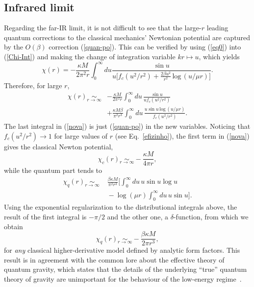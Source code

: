 \documentclass[aps,prd,a4paper,twocolumn,showpacs,showkeys,preprintnumbers,amsmath,amssymb,nofootinbib]{revtex4-2}
\numberwithin{equation}{section}
\def\beq{\begin{equation}}
\def\eeq{\end{equation}}
\def\ln{\,\mbox{log}\,}
\newcommand{\eq}[1]{(\ref{#1})}
\newcommand{\n}[1]{\label{#1}}
\def\be{\beta}
\def\ka{\kappa}
\begin{document}

\subsection{Infrared limit}
\label{pert_D}

Regarding the far-IR limit, it is not difficult to see that the large-$r$ leading quantum corrections to the classical mechanics'  Newtonian potential are captured by the $O(\beta)$ correction \eq{quan-po}. This can be verified by using \eq{eq0} into \eq{Chi-Int} and making the change of integration variable $kr \mapsto u$, which yields
\beq
\chi(r) = -\frac{\ka M}{2 \pi^2 r }\int_0^\infty du \frac{\sin u}{u \Big[ f_c(u^2/r^2) + \tfrac{2 \be u^2}{r^2} \ln (u/\mu r) \Big] }.
\eeq
Therefore, for large $r$,
\beq
\begin{split}
\n{nova}
\chi(r) \underset{r \to \infty}{\sim} &- \frac{\ka M}{2 \pi^2 r }\int_0^\infty {du} \, \frac{\sin u}{u f_c(u^2/r^2)}
\\
& + \frac{\ka M \beta}{\pi^2 r^3 } \int_0^\infty du \, \frac{u \sin u \ln (u/\mu r)}{f_c(u^2/r^2)}
.
\end{split}
\eeq
The last integral in \eq{nova} is just \eq{quan-po} in the new variables. Noticing that $f_c(u^2/r^2) \rightarrow 1$ for large values of $r$ (see Eq.~\eqref{efizinho}), the first term in \eq{nova} gives the  classical Newton potential,
\beq
\chi_c(r) \underset{r \to \infty}{\sim} - \frac{\ka M}{4 \pi r },
\eeq
while the quantum part tends to
%
\begin{equation}
\begin{split}
\chi_q (r) \underset{r \to \infty}{\sim} & \,\, \frac{\be \ka M}{ \pi ^2 r^3} \Bigg[  \int_0^\infty du  \, u \sin u \log u
\\
& \,\, - \log (\mu r) \int_0^\infty du  \, u \sin u  \Bigg] .
\end{split}
\end{equation}
Using the exponential regularization to the distributional integrals above, the result of the first integral is $-\pi/2$ and the other one, a $\delta$-function, from which we obtain
\begin{equation} \label{limitIR}
\chi_q (r) \underset{r \to \infty}{\sim } - \frac{\be \ka M}{ 2 \pi r^3} ,
\end{equation}
for \textit{any} classical higher-derivative model defined by analytic form factors.
%
This result is in agreement with the common lore about the effective theory of quantum gravity, which states that the details of the underlying ``true'' quantum theory of gravity are unimportant for the behaviour of the low-energy regime~\cite{Duff:1974ud,Donoghue:1993&94,Muzinich:1995uj,Hamber:1995cq,Dalvit:1997yc,Akhundov:1996jd,Khriplovich:2002bt,BjerrumBohr:2002kt}. 
\end{document}
